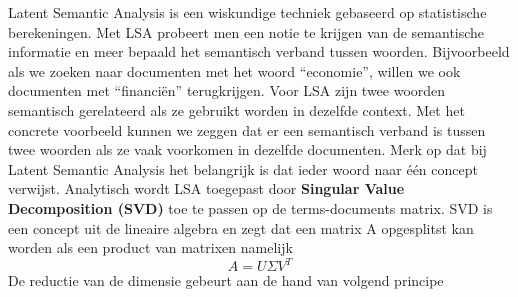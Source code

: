 Latent Semantic Analysis is een wiskundige techniek gebaseerd op statistische berekeningen. Met LSA probeert men een notie te krijgen van de semantische informatie en meer bepaald het semantisch verband tussen woorden. Bijvoorbeeld als we zoeken naar documenten met het woord ``economie'', willen we ook documenten met ``financi\"en'' terugkrijgen. Voor LSA zijn twee woorden semantisch gerelateerd als ze gebruikt worden in dezelfde context. Met het concrete voorbeeld kunnen we zeggen dat er een semantisch verband is tussen twee woorden als ze vaak voorkomen in dezelfde documenten.
\newline
Merk op dat bij Latent Semantic Analysis het belangrijk is dat ieder woord naar \'e\'en concept verwijst.
%
\newline
Analytisch wordt LSA toegepast door \textbf{Singular Value Decomposition (SVD)} toe te passen op de terms-documents matrix. SVD is een concept uit de lineaire algebra en zegt dat een matrix A opgesplitst kan worden als een product van matrixen namelijk \\
\[A = U\Sigma V^T \]
De reductie van de dimensie gebeurt aan de hand van volgend principe
%
\newcommand{\vect}{\mathbf}
\newcommand{\nul}{\operatorname{Nul}}
\newcommand{\col}{\operatorname{Kolommen }}
\newcommand{\row}{\operatorname{Rijen}}
